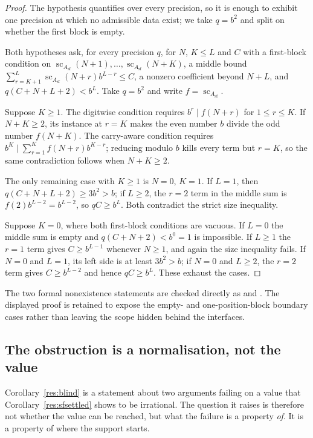\documentclass[11pt]{article}
\newcommand{\scA}{\operatorname{sc}}
\newcommand{\Asf}{A_{\mathrm{sf}}}
\begin{document}
\begin{proof}
The hypothesis quantifies over every precision, so it is enough to exhibit one
precision at which no admissible data exist; we take $q=b^{2}$ and split on
whether the first block is empty.

Both hypotheses ask, for every precision $q$, for $N$, $K\le L$ and $C$ with a
first-block condition on $\scA_{\Asf}(N+1),\dots,\scA_{\Asf}(N+K)$, a middle
bound $\sum_{r=K+1}^{L}\scA_{\Asf}(N+r)b^{L-r}\le C$, a nonzero coefficient
beyond $N+L$, and $q(C+N+L+2)<b^{L}$.  Take $q=b^2$ and write $f=\scA_{\Asf}$.

Suppose $K\ge1$.  The digitwise condition requires $b^{r}\mid f(N+r)$ for
$1\le r\le K$.  If $N+K\ge2$, its instance at $r=K$ makes the even number
$b$ divide the odd number $f(N+K)$.  The carry-aware condition requires
$b^{K}\mid\sum_{r=1}^{K}f(N+r)b^{K-r}$; reducing modulo $b$ kills every term
but $r=K$, so the same contradiction follows when $N+K\ge2$.

The only remaining case with $K\ge1$ is $N=0$, $K=1$.  If $L=1$, then
$q(C+N+L+2)\ge3b^2>b$; if $L\ge2$, the $r=2$ term in the middle sum is
$f(2)b^{L-2}=b^{L-2}$, so $qC\ge b^L$.  Both contradict the strict size
inequality.

Suppose $K=0$, where both first-block conditions are vacuous.  If $L=0$ the
middle sum is empty and $q(C+N+2)<b^{0}=1$ is impossible.  If $L\ge1$ the
$r=1$ term gives $C\ge b^{L-1}$ whenever $N\ge1$, and again the size
inequality fails.  If $N=0$ and $L=1$, its left side is at least
$3b^2>b$; if $N=0$ and $L\ge2$, the $r=2$ term gives
$C\ge b^{L-2}$ and hence $qC\ge b^L$.  These exhaust the cases.
\end{proof}

\noindent The two formal nonexistence statements are checked directly as
and
.
The displayed proof is retained to expose the empty- and one-position-block
boundary cases rather than leaving the scope hidden behind the interfaces.

\subsection{The obstruction is a normalisation, not the value}

Corollary~\ref{res:blind} is a statement about two arguments failing on a value
that Corollary~\ref{res:sfsettled} shows to be irrational.  The question it
raises is therefore not whether the value can be reached, but what the failure
is a property \emph{of}.  It is a property of where the support starts.
\end{document}
